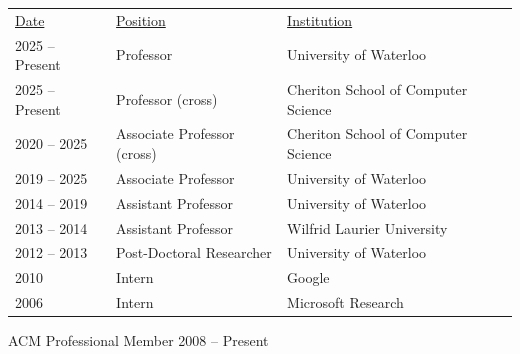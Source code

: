 \documentclass[11pt]{article}
\begin{document}
\begin{table}[h!]
\centering
\begin{tabular}{p{3.5cm} l l}
\underline{Date}                & \underline{Position}                 & \underline{Institution} \\
2025 -- Present     & Professor                & University of Waterloo \\
2025 -- Present     & Professor (cross)        & Cheriton School of Computer Science \\
2020 -- 2025        & Associate Professor (cross) & Cheriton School of Computer Science \\
2019 – 2025         & Associate Professor      & University of Waterloo  \\
2014 – 2019         & Assistant Professor      & University of Waterloo   \\
2013 – 2014         & Assistant Professor      & Wilfrid Laurier University \\
2012 – 2013         & Post-Doctoral Researcher & University of Waterloo  \\
2010                & Intern                   & Google     \\
2006                & Intern                   & Microsoft Research 
\end{tabular}
\end{table}

\sectionbreak
{}

    \printawards[research]

    \printawards[teaching]

    \printawards[recognition]


\sectionbreak
{}
\begin{cvlist}[0pt]
    \cvitem ACM Professional Member 2008 -- Present
\end{cvlist}




\end{document}
